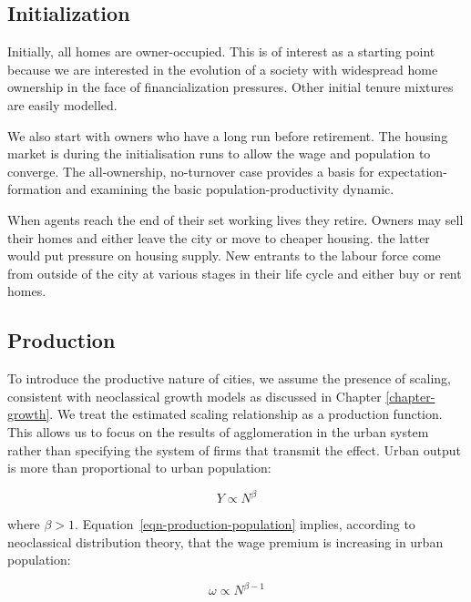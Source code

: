 \subsection{Initialization}
Initially, all homes are owner-occupied. This is of interest  as a starting point because we are interested in the evolution of a society with widespread home ownership in the face of financialization pressures. Other initial tenure mixtures are easily modelled.

We also start with owners who have a long run before retirement. The housing market is  during the initialisation runs to allow the wage and population to converge. The all-ownership, no-turnover case provides a basis for expectation-formation and examining the basic population-productivity dynamic. 

When agents reach the end of their set working lives they retire. %
Owners may sell their homes and either leave the city or move to cheaper housing. the latter would put pressure on housing supply. New entrants to the labour force come from outside of the city at various stages in their life cycle and either buy or rent homes. 

\subsection{Production}
To introduce  the productive nature of cities, we assume the presence of scaling, consistent with neoclassical growth models as discussed in Chapter \ref{chapter-growth}. We treat the estimated scaling relationship as a production function. This allows us to focus on the results of agglomeration in the urban system rather than specifying the system of firms  that transmit the effect. Urban output is more than proportional to urban population: 
 
 \begin{equation}
 Y\propto N^{\beta}
 \label{eqn-production-population}
 \end{equation}

where $\beta >1$.  Equation~\ref{eqn-production-population} implies, according to neoclassical distribution theory, that the wage premium is increasing in urban  population:

\begin{equation}
\omega\propto N^{\beta-1}
\label{eqn-wage-population}
\end{equation}

